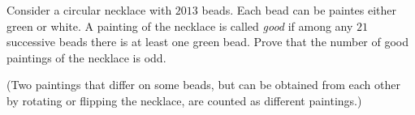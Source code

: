 Consider a circular necklace with \({2013}\) beads. Each bead can be paintes either green or white. A painting of the necklace is called  \textit{good} if among any \({21}\) successive beads there is at least one green bead. Prove that the number of good paintings of the necklace is odd.

(Two paintings that differ on some beads, but can be obtained from each other by rotating or flipping the necklace, are counted as different paintings.)

